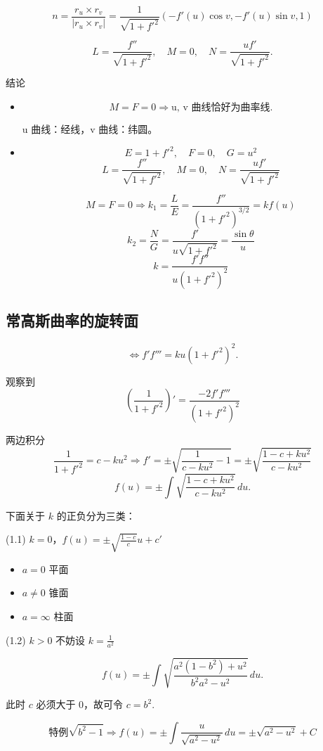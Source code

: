 \documentclass[lang=cn,10pt,thmcnt=section]{elegantbook}
\begin{document}
\[
n = \frac{r_{u} \times r_{v}}{|r_{u} \times r_{v}|} = \frac{1}{\sqrt{1 + f'^2}} (-f'(u)\cos v, -f'(u)\sin v, 1)
\]

\[
L = \frac{f''}{\sqrt{1 + f'^2}}, \quad M = 0, \quad N = \frac{uf'}{\sqrt{1 + f'^2}}.
\]

结论
\begin{itemize}
    \item \[
\boxed{M = F = 0} \Rightarrow \text{u, v 曲线恰好为曲率线}.
\]

u 曲线：经线，v 曲线：纬圆。

    \item \[
E = 1 + f'^2, \quad F = 0, \quad G = u^2
\]
\[
L = \frac{f''}{\sqrt{1 + f'^2}}, \quad M = 0, \quad N = \frac{u f'}{\sqrt{1 + f'^2}}
\]

\[
\boxed{M = F = 0} \Rightarrow k_1 = \frac{L}{E} = \frac{f''}{(1 + f'^2)^{3/2}} = k f(u)
\]
\[
k_2 = \frac{N}{G} = \frac{f'}{u \sqrt{1 + f'^2}} = \frac{\sin \theta}{u}
\]
\[
k = \frac{f' f''}{u (1 + f'^2)^2}
\]

\end{itemize}
\subsection{常高斯曲率的旋转面}
\[
\Leftrightarrow f'f''' = ku(1 + f'^2)^2.
\]

观察到
\[
\left(\frac{1}{1 + f'^2}\right)' = \frac{-2f'f'''}{(1 + f'^2)^2}
\]

两边积分
\[
\frac{1}{1 + f'^2} = c - ku^2 \Rightarrow f' = \pm \sqrt{\frac{1}{c - ku^2} - 1} = \pm \sqrt{\frac{1 - c + ku^2}{c - ku^2}}
\]
\[
f(u) = \pm \int \sqrt{\frac{1 - c + ku^2}{c - ku^2}} \, du.
\]

下面关于 $k$ 的正负分为三类：

(1.1) $k = 0$，$f(u) = \pm \sqrt{\frac{1 - c}{c}} u + c'$

\begin{itemize}
    \item $a = 0$ 平面
    \item $a \neq 0$ 锥面
    \item $a = \infty$ 柱面
\end{itemize}

(1.2) $k > 0$ 不妨设 $k = \frac{1}{a^2}$

\[
f(u) = \pm \int \sqrt{\frac{a^2(1 - b^2) + u^2}{b^2a^2 - u^2}} \, du.
\]

此时 $c$ 必须大于 0，故可令 $c = b^2$.

\[
\text{特例} \sqrt{b^2 - 1} \Rightarrow f(u) = \pm \int \frac{u}{\sqrt{a^2 - u^2}} \, du = \pm \sqrt{a^2 - u^2} + C
\]
\end{document}

